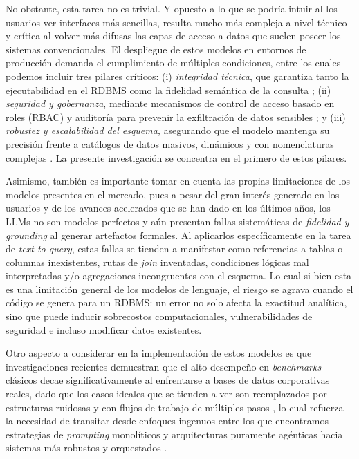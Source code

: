 No obstante, esta tarea no es trivial. Y opuesto a lo que se podría intuir al los usuarios ver interfaces más sencillas, resulta mucho más compleja a nivel técnico y crítica al volver más difusas las capas de acceso a datos que suelen poseer los sistemas convencionales. El despliegue de estos modelos en entornos de producción demanda el cumplimiento de múltiples condiciones, entre los cuales podemos incluir tres pilares críticos: (i) \emph{integridad técnica}, que garantiza tanto la ejecutabilidad en el \ac{RDBMS} como la fidelidad semántica de la consulta \cite{spider2_2025}; (ii) \emph{seguridad y gobernanza}, mediante mecanismos de control de acceso basado en roles (\ac{RBAC}) y auditoría para prevenir la exfiltración de datos sensibles \cite{SAFENLIDB}; y (iii) \emph{robustez y escalabilidad del esquema}, asegurando que el modelo mantenga su precisión frente a catálogos de datos masivos, dinámicos y con nomenclaturas complejas \cite{llmfk}. La presente investigación se concentra en el primero de estos pilares.

Asimismo, también es importante tomar en cuenta las propias limitaciones de los modelos presentes en el mercado, pues a pesar del gran interés generado en los usuarios y de los avances acelerados que se han dado en los últimos años, los \acp{LLM} no son modelos perfectos y aún presentan fallas sistemáticas de \emph{fidelidad y grounding} al generar artefactos formales. Al aplicarlos específicamente en la tarea de \emph{text-to-query}, estas fallas se tienden a manifestar como referencias a tablas o columnas inexistentes, rutas de \emph{join} inventadas, condiciones lógicas mal interpretadas y/o agregaciones incongruentes con el esquema. Lo cual si bien esta es una limitación general de los modelos de lenguaje, el riesgo se agrava cuando el código se genera para un \ac{RDBMS}: un error no solo afecta la exactitud analítica, sino que puede inducir sobrecostos computacionales, vulnerabilidades de seguridad e incluso modificar datos existentes.

Otro aspecto a considerar en la implementación de estos modelos es que investigaciones recientes demuestran que el alto desempeño en \emph{benchmarks} clásicos decae significativamente al enfrentarse a bases de datos corporativas reales, dado que los casos ideales que se tienden a ver son reemplazados por estructuras ruidosas y con flujos de trabajo de múltiples pasos \cite{BIRD2023, spider2_2025}, lo cual refuerza la necesidad de transitar desde enfoques ingenuos entre los que encontramos estrategias de \emph{prompting} monolíticos y arquitecturas puramente agénticas hacia sistemas más robustos y orquestados \cite{EvaluatingRobustness}.


